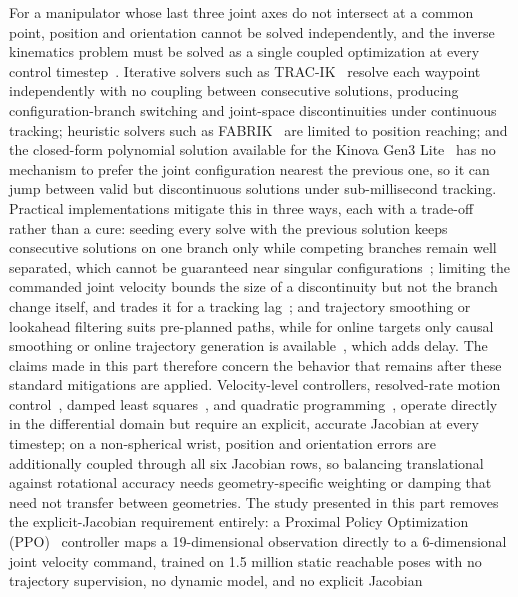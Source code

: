 For a manipulator whose last three joint axes do not intersect at a common point, position and
orientation cannot be solved independently, and the inverse kinematics problem must be solved as a
single coupled optimization at every control timestep~\citep{sk2025diktracking}. Iterative solvers
such as TRAC-IK~\citep{beeson2015trac} resolve each waypoint independently with no coupling between
consecutive solutions, producing configuration-branch switching and joint-space discontinuities
under continuous tracking; heuristic solvers such as FABRIK~\citep{aristidou2011fabrik} are limited
to position reaching; and the closed-form polynomial solution available for the Kinova Gen3
Lite~\citep{zohour2021kinova} has no mechanism to prefer the joint configuration nearest the
previous one, so it can jump between valid but discontinuous solutions under sub-millisecond
tracking. Practical implementations mitigate this in three ways, each with a trade-off rather than a
cure: seeding every solve with the previous solution keeps consecutive solutions on one branch only
while competing branches remain well separated, which cannot be guaranteed near singular
configurations~\citep{beeson2015trac,dai2019global}; limiting the commanded joint velocity bounds the
size of a discontinuity but not the branch change itself, and trades it for a tracking
lag~\citep{faroni2018predictive}; and trajectory smoothing or lookahead filtering suits pre-planned
paths, while for online targets only causal smoothing or online trajectory generation is
available~\citep{kroger2010line,macfarlane2003jerk}, which adds delay. The claims made in this part
therefore concern the behavior that remains after these standard mitigations are applied.
Velocity-level controllers, resolved-rate motion control~\citep{whitney1969resolved}, damped least
squares~\citep{wampler1986manipulator,chiaverini1994review}, and quadratic
programming~\citep{zhang2013variable}, operate directly in the differential domain but require an
explicit, accurate Jacobian at every timestep; on a non-spherical wrist, position and orientation
errors are additionally coupled through all six Jacobian rows, so balancing translational against
rotational accuracy needs geometry-specific weighting or damping that need not transfer between
geometries. The study presented in this part removes the explicit-Jacobian requirement entirely: a
Proximal Policy Optimization (PPO)~\citep{schulman2017proximal} controller maps a 19-dimensional
observation directly to a 6-dimensional joint velocity command, trained on 1.5 million static
reachable poses with no trajectory supervision, no dynamic model, and no explicit Jacobian
